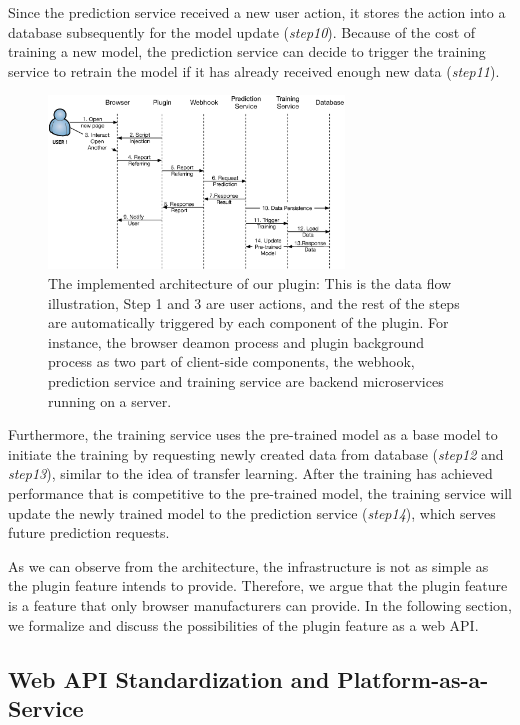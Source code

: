 Since the prediction service received a new user action, it stores the action into a database
subsequently for the model update (\emph{step10}). Because of the cost of training a new model,
the prediction service can decide to trigger the training service to retrain the model 
if it has already received enough new data (\emph{step11}).

\begin{figure}[H]
    \centering
    \includegraphics[width=0.7\textwidth]{figures/arch}
    \caption{The implemented architecture of our plugin: This is the data flow illustration,
    Step 1 and 3 are user actions, and the rest of the steps are automatically triggered by
    each component of the plugin. For instance, the browser deamon process
    and plugin background process as two part of client-side components, the webhook,
    prediction service and training service are backend microservices running on a server.}
    \label{fig:arch}
\end{figure}

Furthermore, the training service uses the pre-trained model as
a base model to initiate the training by requesting newly created data from database (\emph{step12} and \emph{step13}), 
similar to the idea of transfer learning.
After the training has achieved performance that is competitive to the pre-trained model,
the training service will update the newly trained model to the prediction service (\emph{step14}), which 
serves future prediction requests.

As we can observe from the architecture, the infrastructure is not as simple as 
the plugin feature intends to provide. Therefore, we argue that the plugin feature is a feature that
only browser manufacturers can provide. In the following section, we formalize and discuss 
the possibilities of the plugin feature as a web API.

\subsection{Web API Standardization and Platform-as-a-Service}

